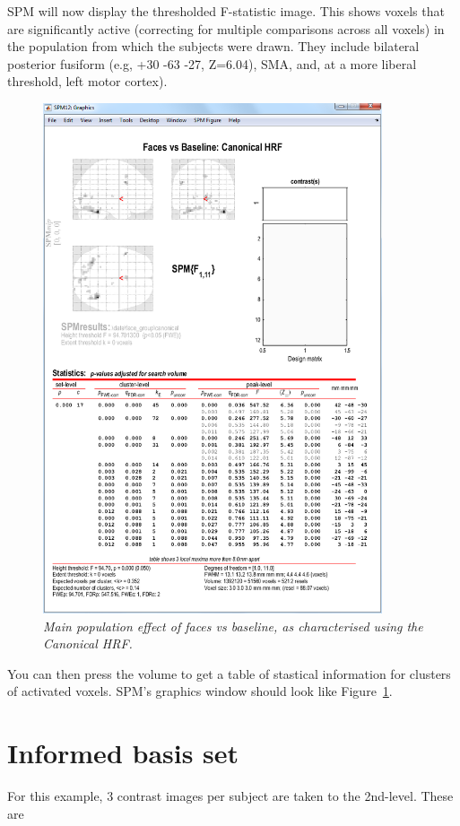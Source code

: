 SPM will now display the thresholded F-statistic image. This shows voxels that are significantly active (correcting for multiple comparisons across all voxels) in the population from which the subjects were drawn. They include bilateral posterior fusiform (e.g, +30 -63 -27, Z=6.04), SMA, and, at a more liberal threshold, left motor cortex). 
\begin{figure}
\begin{center}
\includegraphics[width=100mm]{faces_group/f1_res}
\caption{\em Main population effect of faces vs baseline, as characterised using the Canonical HRF. \label{f1_res}}
\end{center}
\end{figure}
You can then press the volume to get a table of stastical information for clusters of activated voxels. SPM's graphics window should look like Figure~\ref{f1_res}.

\section{Informed basis set}

For this example, 3 contrast images per subject are taken to the 2nd-level. These are

